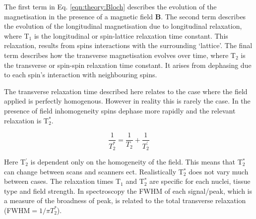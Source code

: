 The first term in Eq. \ref{eqn:theory:Bloch} describes the evolution of the magnetisation in the presence of a magnetic field $\mathbf{B}$. The second term describes the evolution of the longitudinal magnetisation due to longitudinal relaxation, where T$_1$ is the longitudinal or spin-lattice relaxation time constant. This relaxation, results from spins interactions with the surrounding `lattice'. The final term describes how the transverse magnetisation evolves over time, where T$_2$ is the transverse or spin-spin relaxation time constant. It arises from dephasing due to each spin's interaction with neighbouring spins. 

The transverse relaxation time described here relates to the case where the field applied is perfectly homogenous. However in reality this is rarely the case. In the presence of field inhomogeneity spins dephase more rapidly and the relevant relaxation is T$_2^*$.

\begin{equation}
    \frac{1}{T_2^*} = \frac{1}{T_2} + \frac{1}{T_2^{'}}
    \label{eqn:theory:trans}
\end{equation}

Here T$_2^{'}$ is dependent only on the homogeneity of the field. This means that T$_2^*$ can change between scans and scanners ect. Realistically T$_2^*$ does not vary much between cases. The relaxation times T$_1$ and T$_2^*$ are specific for each nuclei, tissue type and field strength. In spectroscopy the \ac{FWHM} of each signal/peak, which is a measure of the broadness of peak, is related to the total transverse relaxation (\ac{FWHM}$ = 1 / \pi T_2^*$). 


